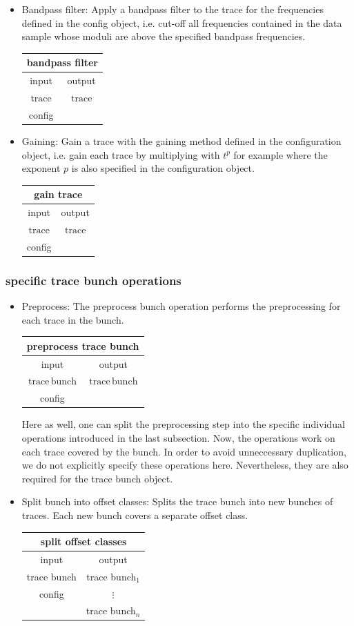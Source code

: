 \documentclass[12pt,a4paper]{article}
\newcommand{\bet}[1]{\begin{center}
		     \begin{tabular}{|c|c|}
		     \hline
		     \multicolumn{2}{|c|}{#1}\\
		     \hline\hline
		     input & output \\
                     \hline}
\newcommand{\eet}{\hline
		  \end{tabular}
		  \end{center}}
\begin{document}
\begin{itemize}
\begin{itemize}
\bet{derivative filter}
$\mathrm{trace}$ & $\mathrm{trace}$\\
\eet
\item Bandpass filter:
\newline
Apply a bandpass filter to the trace for the frequencies
defined in the config object, i.e. cut-off all frequencies
contained in the data sample whose moduli are above the specified bandpass frequencies.
\bet{bandpass filter}
$\mathrm{trace}$ & $\mathrm{trace}$\\
config             & \\
\eet
\item Gaining:
\newline
Gain a trace with the gaining method defined in the configuration object, 
i.e. gain each trace by multiplying with $t^p$ for example 
where the exponent $p$ is also specified in the configuration object. 
\bet{gain trace}
$\mathrm{trace}$ & $\mathrm{trace}$\\
config             & \\
\eet
\end{itemize}

\end{itemize}

\subsubsection{specific trace bunch operations}
\begin{itemize}
\item Preprocess:
\newline
The preprocess bunch operation performs the preprocessing
for each trace in the bunch. 
\bet{preprocess trace bunch}
$\mathrm{trace\,bunch}$ & $\mathrm{trace\,bunch}$\\
config & \\
\eet
Here as well, one can split 
the preprocessing step into the specific individual operations introduced in 
the last subsection. Now, the operations work on each trace covered by the
bunch. In order to avoid unneccessary duplication, we do not explicitly specify 
these operations here. Nevertheless, they
are also required for the trace bunch object.   

\item Split bunch into offset classes:
\newline
Splits the trace bunch into new bunches of traces.
Each new bunch covers a separate offset class. 
\bet{split offset classes}
trace bunch & trace bunch$_1$\\ 
config      & $\vdots$\\
            & trace bunch$_n$\\
\eet
\end{itemize}
\end{document}
